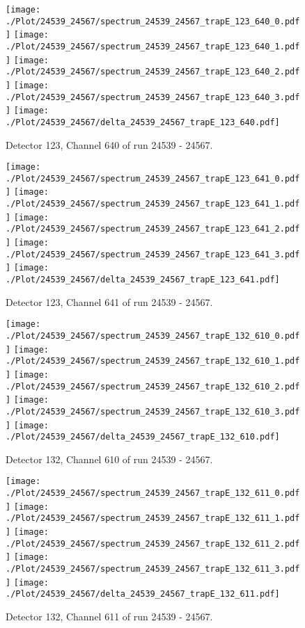 \clearpage
\begin{figure}[hb]
\centering
\texttt{[image: ./Plot/24539\_24567/spectrum\_24539\_24567\_trapE\_123\_640\_0.pdf]}
\texttt{[image: ./Plot/24539\_24567/spectrum\_24539\_24567\_trapE\_123\_640\_1.pdf]}
\texttt{[image: ./Plot/24539\_24567/spectrum\_24539\_24567\_trapE\_123\_640\_2.pdf]}
\texttt{[image: ./Plot/24539\_24567/spectrum\_24539\_24567\_trapE\_123\_640\_3.pdf]}
\texttt{[image: ./Plot/24539\_24567/delta\_24539\_24567\_trapE\_123\_640.pdf]}
\caption{ Detector 123, Channel 640 of run 24539 - 24567.}
\label{fig:24539_24567_trapE_123_640}
\end{figure}
\clearpage
\begin{figure}[hb]
\centering
\texttt{[image: ./Plot/24539\_24567/spectrum\_24539\_24567\_trapE\_123\_641\_0.pdf]}
\texttt{[image: ./Plot/24539\_24567/spectrum\_24539\_24567\_trapE\_123\_641\_1.pdf]}
\texttt{[image: ./Plot/24539\_24567/spectrum\_24539\_24567\_trapE\_123\_641\_2.pdf]}
\texttt{[image: ./Plot/24539\_24567/spectrum\_24539\_24567\_trapE\_123\_641\_3.pdf]}
\texttt{[image: ./Plot/24539\_24567/delta\_24539\_24567\_trapE\_123\_641.pdf]}
\caption{ Detector 123, Channel 641 of run 24539 - 24567.}
\label{fig:24539_24567_trapE_123_641}
\end{figure}
\clearpage
\begin{figure}[hb]
\centering
\texttt{[image: ./Plot/24539\_24567/spectrum\_24539\_24567\_trapE\_132\_610\_0.pdf]}
\texttt{[image: ./Plot/24539\_24567/spectrum\_24539\_24567\_trapE\_132\_610\_1.pdf]}
\texttt{[image: ./Plot/24539\_24567/spectrum\_24539\_24567\_trapE\_132\_610\_2.pdf]}
\texttt{[image: ./Plot/24539\_24567/spectrum\_24539\_24567\_trapE\_132\_610\_3.pdf]}
\texttt{[image: ./Plot/24539\_24567/delta\_24539\_24567\_trapE\_132\_610.pdf]}
\caption{ Detector 132, Channel 610 of run 24539 - 24567.}
\label{fig:24539_24567_trapE_132_610}
\end{figure}
\clearpage
\begin{figure}[hb]
\centering
\texttt{[image: ./Plot/24539\_24567/spectrum\_24539\_24567\_trapE\_132\_611\_0.pdf]}
\texttt{[image: ./Plot/24539\_24567/spectrum\_24539\_24567\_trapE\_132\_611\_1.pdf]}
\texttt{[image: ./Plot/24539\_24567/spectrum\_24539\_24567\_trapE\_132\_611\_2.pdf]}
\texttt{[image: ./Plot/24539\_24567/spectrum\_24539\_24567\_trapE\_132\_611\_3.pdf]}
\texttt{[image: ./Plot/24539\_24567/delta\_24539\_24567\_trapE\_132\_611.pdf]}
\caption{ Detector 132, Channel 611 of run 24539 - 24567.}
\label{fig:24539_24567_trapE_132_611}
\end{figure}
